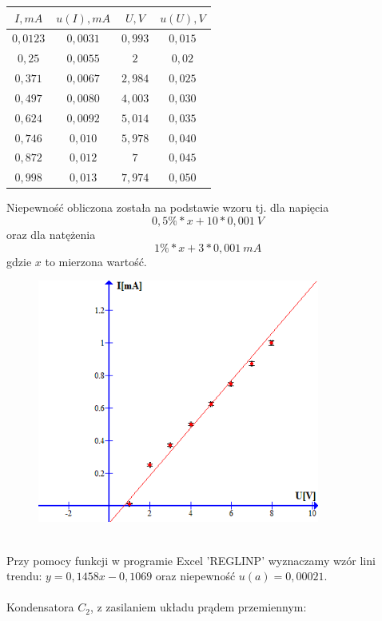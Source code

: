 \documentclass{article}
\begin{document}
\begin{center}
    \begin{tabular}{|c|c|c|c|}
    \hline
$I,mA$ & $u(I), mA$ & $U,V$ & $u(U), V$\\ \hline
$0,0123$ & $0,0031$ & $0,993$ & $0,015$\\ \hline
$0,25$ & $0,0055$ & $2$ & $0,02$\\ \hline
$0,371$ & $0,0067$ & $2,984$ & $0,025$\\ \hline
$0,497$ & $0,0080$ & $4,003$ & $0,030$\\ \hline
$0,624$ & $0,0092$ & $5,014$ & $0,035$\\ \hline
$0,746$ & $0,010$ & $5,978$ & $0,040$\\ \hline
$0,872$ & $0,012$ & $7$ & $0,045$\\ \hline
$0,998$ & $0,013$ & $7,974$ & $0,050$\\ \hline
    \end{tabular}
\end{center}
Niepewność obliczona została na podstawie wzoru tj. dla napięcia
$$0,5\% * x + 10 * 0,001\ V $$
oraz dla natężenia
$$1\% * x + 3 * 0,001\ mA$$
gdzie $x$ to mierzona wartość.
\begin{figure}[ht]
\centering
\includegraphics[height=8cm]{wykres_4.png}
\end{figure}\\
Przy pomocy funkcji w programie Excel 'REGLINP' wyznaczamy wzór lini trendu: $y = 0,1458x - 0,1069$ oraz niepewność $u(a) = 0,00021$.\\\\
Kondensatora $C_2$, z zasilaniem układu prądem przemiennym:
\end{document}
